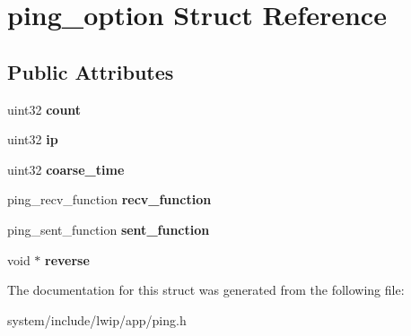 \hypertarget{structping__option}{}\section{ping\+\_\+option Struct Reference}
\label{structping__option}
\subsection*{Public Attributes}
\begin{DoxyCompactItemize}
\item 
\hypertarget{structping__option_aaeae4d79766b00e0c0775a879822900b}{}uint32 {\bfseries count}\label{structping__option_aaeae4d79766b00e0c0775a879822900b}

\item 
\hypertarget{structping__option_a5651a366b7aaae8cbb77dd2f339aafc1}{}uint32 {\bfseries ip}\label{structping__option_a5651a366b7aaae8cbb77dd2f339aafc1}

\item 
\hypertarget{structping__option_ac067c82d950fc709d9dbf3f30a2a4eb0}{}uint32 {\bfseries coarse\+\_\+time}\label{structping__option_ac067c82d950fc709d9dbf3f30a2a4eb0}

\item 
\hypertarget{structping__option_adaff73ea4b12a2b27fccf3e0bb4d5d22}{}ping\+\_\+recv\+\_\+function {\bfseries recv\+\_\+function}\label{structping__option_adaff73ea4b12a2b27fccf3e0bb4d5d22}

\item 
\hypertarget{structping__option_ab7be798b88b78aa0a2d299dd8c8d0f7f}{}ping\+\_\+sent\+\_\+function {\bfseries sent\+\_\+function}\label{structping__option_ab7be798b88b78aa0a2d299dd8c8d0f7f}

\item 
\hypertarget{structping__option_a1f15b064c15989adbdfec979d41409e2}{}void $\ast$ {\bfseries reverse}\label{structping__option_a1f15b064c15989adbdfec979d41409e2}

\end{DoxyCompactItemize}


The documentation for this struct was generated from the following file\+:\begin{DoxyCompactItemize}
\item 
system/include/lwip/app/ping.\+h\end{DoxyCompactItemize}
